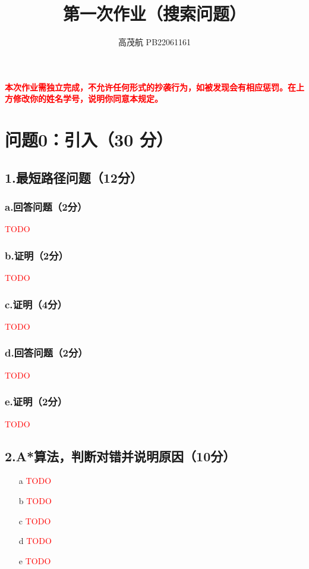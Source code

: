 \documentclass{article}
\title{\bfseries 第一次作业（搜索问题）}
\author{高茂航  \quad  PB22061161}
\begin{document}
\maketitle
\textcolor{red}{\textbf{本次作业需独立完成，不允许任何形式的抄袭行为，如被发现会有相应惩罚。在上方修改你的姓名学号，说明你同意本规定。}}

\section*{问题0：引入（30 分）}
\subsection*{1.最短路径问题（12分）}
\subsubsection*{a.回答问题（2分）}
\textcolor{red}{TODO}

\subsubsection*{b.证明（2分）}
\textcolor{red}{TODO}

\subsubsection*{c.证明（4分）}
\textcolor{red}{TODO}

\subsubsection*{d.回答问题（2分）}
\textcolor{red}{TODO}

\subsubsection*{e.证明（2分）}
\textcolor{red}{TODO}

\subsection*{2.A*算法，判断对错并说明原因（10分）}

\begin{enumerate}
    \item[a] \textcolor{red}{TODO}
    \item[b] \textcolor{red}{TODO}
    \item[c] \textcolor{red}{TODO}
    \item[d] \textcolor{red}{TODO}
    \item[e] \textcolor{red}{TODO}
\end{enumerate}
\end{document}
